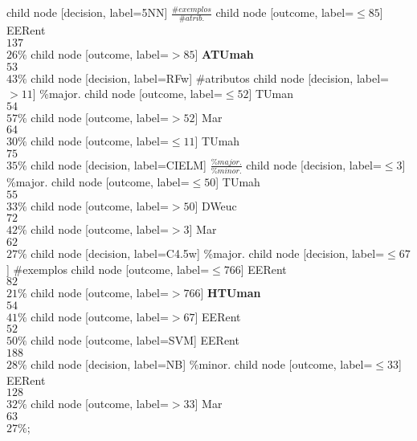 child {node [decision, label=5NN] {$\frac{\#exemplos}{\#atrib.}$}
child {node [outcome, label=$\leq85$] {EERent \\$137$\\$26\%$}}
child {node [outcome, label=$>85$] {\textbf{ATUmah} \\$53$\\$43\%$}}}
child {node [decision, label=RFw] {\#atributos}
child {node [decision, label=$>11$] {\%major.}
child {node [outcome, label=$\leq52$] {TUman \\$54$\\$57\%$}}
child {node [outcome, label=$>52$] {Mar \\$64$\\$30\%$}}}
child {node [outcome, label=$\leq11$] {TUmah \\$75$\\$35\%$}}}
child {node [decision, label=CIELM] {$\frac{\%major.}{\%minor.}$}
child {node [decision, label=$\leq3$] {\%major.}
child {node [outcome, label=$\leq50$] {TUmah \\$55$\\$33\%$}}
child {node [outcome, label=$>50$] {DWeuc \\$72$\\$42\%$}}}
child {node [outcome, label=$>3$] {Mar \\$62$\\$27\%$}}}
child {node [decision, label=C4.5w] {\%major.}
child {node [decision, label=$\leq67$] {\#exemplos}
child {node [outcome, label=$\leq766$] {EERent \\$82$\\$21\%$}}
child {node [outcome, label=$>766$] {\textbf{HTUman} \\$54$\\$41\%$}}}
child {node [outcome, label=$>67$] {EERent \\$52$\\$50\%$}}}
child {node [outcome, label=SVM] {EERent \\$188$\\$28\%$}}
child {node [decision, label=NB] {\%minor.}
child {node [outcome, label=$\leq33$] {EERent \\$128$\\$32\%$}}
child {node [outcome, label=$>33$] {Mar \\$63$\\$27\%$}}};